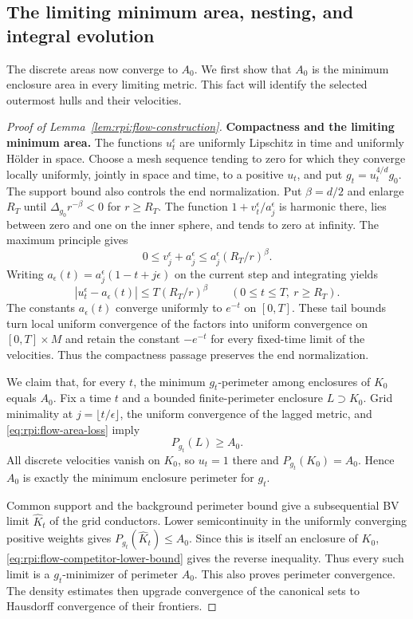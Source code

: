 \subsection{The limiting minimum area, nesting, and integral evolution}

The discrete areas now converge to $A_0$. We first show that $A_0$ is
the minimum enclosure area in every limiting metric. This fact will
identify the selected outermost hulls and their velocities.

\begin{proof}[Proof of Lemma~\ref{lem:rpi:flow-construction}]
\textbf{Compactness and the limiting minimum area.}\quad
The functions $u_t^\epsilon$ are uniformly Lipschitz in time and
uniformly H\"older in space. Choose a mesh sequence tending to zero
for which they converge locally uniformly, jointly in space and
time, to a positive $u_t$, and put $g_t=u_t^{4/d}g_0$.
The support bound also controls the end normalization. Put
$\beta=d/2$ and enlarge $R_T$ until
$\Delta_{g_0}r^{-\beta}<0$ for $r\ge R_T$. The function
$1+v_t^\epsilon/a_j^\epsilon$ is harmonic there, lies between
zero and one on the inner sphere, and tends to zero at infinity.
The maximum principle gives
\[
 0\le v_j^\epsilon+a_j^\epsilon
       \le a_j^\epsilon(R_T/r)^\beta.
\]
Writing
$a_\epsilon(t)=a_j^\epsilon(1-t+j\epsilon)$ on the current
step and integrating yields
\[
 |u_t^\epsilon-a_\epsilon(t)|\le T(R_T/r)^\beta
 \qquad(0\le t\le T,\ r\ge R_T).
\]
The constants $a_\epsilon(t)$ converge uniformly to $e^{-t}$
on $[0,T]$. These tail bounds turn local uniform convergence of
the factors into uniform convergence on $[0,T]\times M$ and
retain the constant $-e^{-t}$ for every fixed-time limit of the
velocities. Thus the compactness passage preserves the end normalization.

We claim that, for every $t$, the minimum $g_t$-perimeter among
enclosures of $K_0$ equals $A_0$. Fix a time $t$ and a bounded
finite-perimeter enclosure $L\supset K_0$.
Grid minimality at $j=\lfloor t/\epsilon\rfloor$, the uniform
convergence of the lagged metric, and
\eqref{eq:rpi:flow-area-loss} imply
\begin{equation}
\label{eq:rpi:flow-competitor-lower-bound}
 P_{g_t}(L)\ge A_0.
\end{equation}
All discrete velocities vanish on $K_0$, so $u_t=1$ there and
$P_{g_t}(K_0)=A_0$. Hence $A_0$ is exactly the minimum enclosure
perimeter for $g_t$.

Common support and the background perimeter bound give a
subsequential BV limit $\widehat K_t$ of the grid conductors.
Lower semicontinuity in the uniformly converging positive weights
gives $P_{g_t}(\widehat K_t)\le A_0$. Since this is itself an
enclosure of $K_0$, \eqref{eq:rpi:flow-competitor-lower-bound}
gives the reverse inequality. Thus every such limit is a
$g_t$-minimizer of perimeter $A_0$. This also proves perimeter
convergence. The density estimates
then upgrade convergence of the canonical sets to Hausdorff
convergence of their frontiers.


\end{proof}
